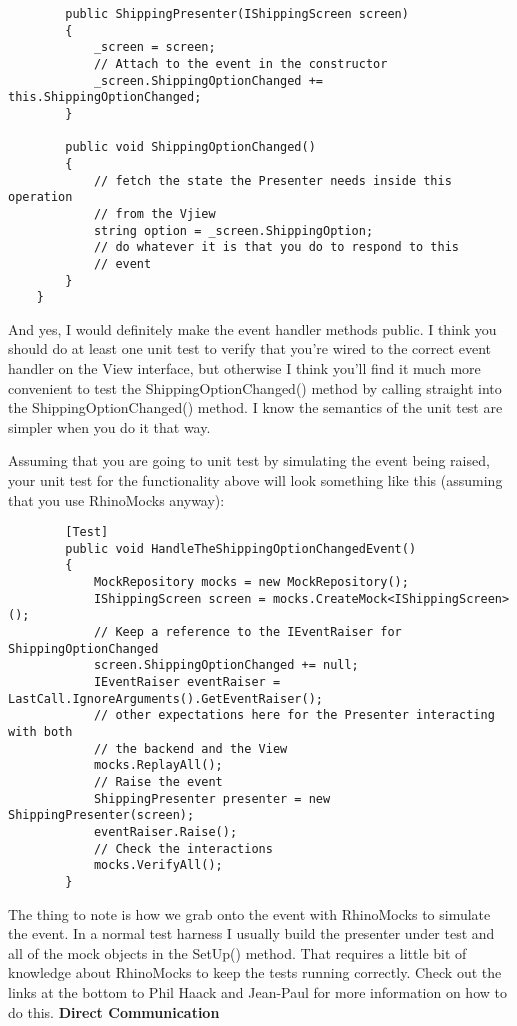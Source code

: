 \documentclass{article}
\begin{document}
{\begin{lstlisting}
        public ShippingPresenter(IShippingScreen screen)
        {
            _screen = screen;
            // Attach to the event in the constructor
            _screen.ShippingOptionChanged += this.ShippingOptionChanged;
        }

        public void ShippingOptionChanged()
        {
            // fetch the state the Presenter needs inside this operation
            // from the Vjiew
            string option = _screen.ShippingOption;
            // do whatever it is that you do to respond to this
            // event
        }
    }
 \end{lstlisting}

And yes, I would definitely make the event handler methods public.  I think you should do at least one unit test to verify that you're wired to the correct event handler on the View interface, but otherwise I think you'll find it much more convenient to test the ShippingOptionChanged() method by calling straight into the ShippingOptionChanged() method.  I know the semantics of the unit test are simpler when you do it that way.

Assuming that you are going to unit test by simulating the event being raised, your unit test for the functionality above will look something like this (assuming that you use RhinoMocks anyway):
\newpage
 \begin{lstlisting}
        [Test]
        public void HandleTheShippingOptionChangedEvent()
        {
            MockRepository mocks = new MockRepository();
            IShippingScreen screen = mocks.CreateMock<IShippingScreen>();
            // Keep a reference to the IEventRaiser for ShippingOptionChanged
            screen.ShippingOptionChanged += null;
            IEventRaiser eventRaiser = LastCall.IgnoreArguments().GetEventRaiser();
            // other expectations here for the Presenter interacting with both
            // the backend and the View
            mocks.ReplayAll();
            // Raise the event
            ShippingPresenter presenter = new ShippingPresenter(screen);
            eventRaiser.Raise();
            // Check the interactions
            mocks.VerifyAll();
        }
 \end{lstlisting}
		
The thing to note is how we grab onto the event with RhinoMocks to simulate the event.  In a normal test harness I usually build the presenter under test and all of the mock objects in the SetUp() method.  That requires a little bit of knowledge about RhinoMocks to keep the tests running correctly.  Check out the links at the bottom to Phil Haack and Jean-Paul for more information on how to do this.
\Large {\textbf{Direct Communication}}

}
\end{document}
